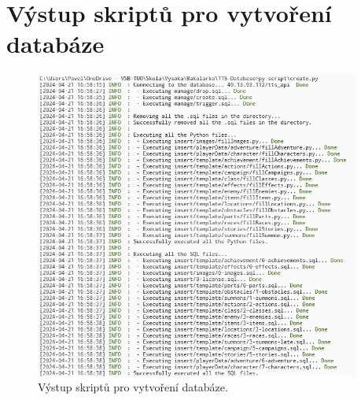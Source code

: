 \chapter{Výstup skriptů pro vytvoření databáze}
\label{ch:appendix-database-scripts-output}

\vspace{-4em}

\begin{figure}[ht]
    \centering
    \includegraphics[width=0.95\textwidth]{figures/dbScriptsOutput}
    \caption{Výstup skriptů pro vytvoření databáze.}
    \label{fig:databaseScriptsOutput}
\end{figure}

\endinput